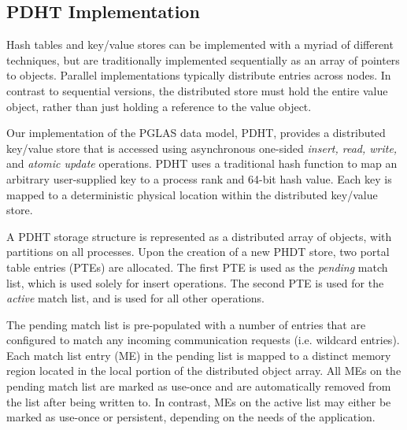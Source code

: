 \subsection{PDHT Implementation}

Hash tables and key/value stores can be implemented with a myriad of different
techniques, but are traditionally implemented sequentially as an array of
pointers to objects.  Parallel implementations typically distribute entries
across nodes. In contrast to sequential versions, the distributed store must
hold the entire value object, rather than just holding a reference to the value
object.



Our implementation of the PGLAS data model, PDHT, provides a distributed
key/value store that is accessed using asynchronous one-sided {\em insert,
  read, write,} and {\em atomic update} operations. PDHT uses a traditional
hash function\cite{cityhash} to map an arbitrary user-supplied key to a process
rank and 64-bit hash value. Each key is mapped to a deterministic physical
location within the distributed key/value store.

A PDHT storage structure is represented as a distributed array of objects, with
partitions on all processes. Upon the creation of a new PHDT store, two portal
table entries (PTEs) are allocated. The first PTE is used as the {\em pending}
match list, which is used solely for insert operations.  The second PTE is used
for the {\em active} match list, and is used for all other operations. 

The pending match list is pre-populated with a number of entries that are
configured to match any incoming communication requests (i.e. wildcard
entries). Each match list entry (ME) in the pending list is mapped to a
distinct memory region located in the local portion of the distributed object
array. All MEs on the pending match list are marked as use-once and are
automatically removed from the list after being written to. In contrast, MEs on
the active list may either be marked as use-once or persistent, depending on
the needs of the application.

